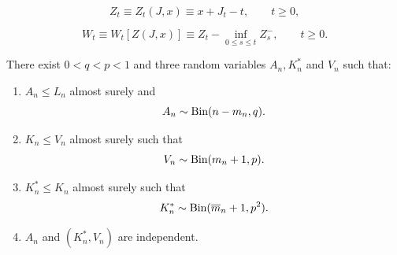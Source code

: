 \documentclass[10pt,a4paper]{amsart}
\begin{document}
\begin{equation}\label{eq: Z}
Z_t\equiv Z_t\left(J,x\right)\equiv x +J_t-t,\qquad t\geq0,
\end{equation}

\begin{equation}\label{eq: W}
W_t\equiv W_t\left[Z(J,x)\right]\equiv Z_t-\inf_{0\leq s\leq t} Z_s^-,\qquad t\geq0.    
\end{equation}

\begin{lemma}\label{lem: coupling}
There exist  $0<q<p<1$ and three random variables $A_n,K_n^*$ and $V_n$ such that:
\begin{enumerate}
    \item[(i)] $A_n\leq L_n$ almost surely and 
    \begin{equation*}
        A_n\sim\text{\normalfont Bin}(n-m_n,q).
    \end{equation*}

    \item[(ii)] $K_n\leq V_n$ almost surely such that 
    \begin{equation*}
    V_n\sim\text{\normalfont Bin}(m_n+1,p).
    \end{equation*}
    \item[(iii)] $K_n^*\leq K_n$ almost surely such that 
   \begin{equation*}
    K_n^*\sim\text{\normalfont Bin}(\overline m_n+1,p^2).
    \end{equation*}
    
     \item[(iv)] $A_n$ and $(K_n^*,V_n)$ are independent.  \end{enumerate}

\end{lemma}
\end{document}

